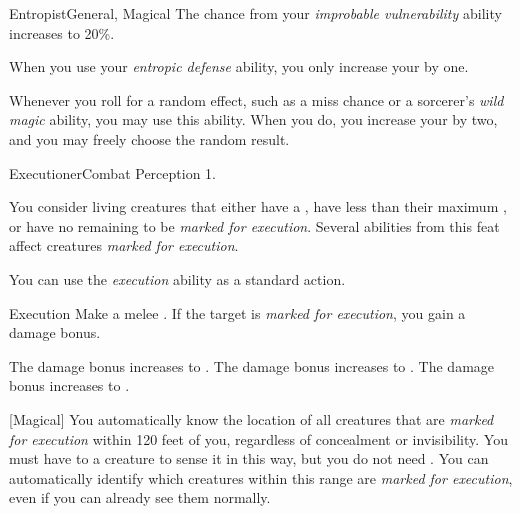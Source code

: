 \begin{feat}{Entropist}{General, Magical}
         The chance from your \textit{improbable vulnerability} ability increases to 20\%.

         When you use your \textit{entropic defense} ability, you only increase your  by one.

         Whenever you roll for a random effect, such as a miss chance or a sorcerer's \textit{wild magic} ability, you may use this ability.
        When you do, you increase your  by two, and you may freely choose the random result.
    \end{feat}

    \begin{feat}{Executioner}{Combat}
        \featpres Perception 1.

         You consider living creatures that either have a , have less than their maximum , or have no remaining  to be \textit{marked for execution}.
        Several abilities from this feat affect creatures \textit{marked for execution}.

         You can use the \textit{execution} ability as a standard action.
        \begin{freeability}{Execution}
            Make a melee .
            If the target is \textit{marked for execution}, you gain a  damage bonus.

            \rankline
             The damage bonus increases to .
             The damage bonus increases to .
             The damage bonus increases to .
        \end{freeability}

        [Magical] You automatically know the location of all creatures that are \textit{marked for execution} within 120 feet of you, regardless of concealment or invisibility.
        You must have  to a creature to sense it in this way, but you do not need .
        You can automatically identify which creatures within this range are \textit{marked for execution}, even if you can already see them normally.


\end{feat}
